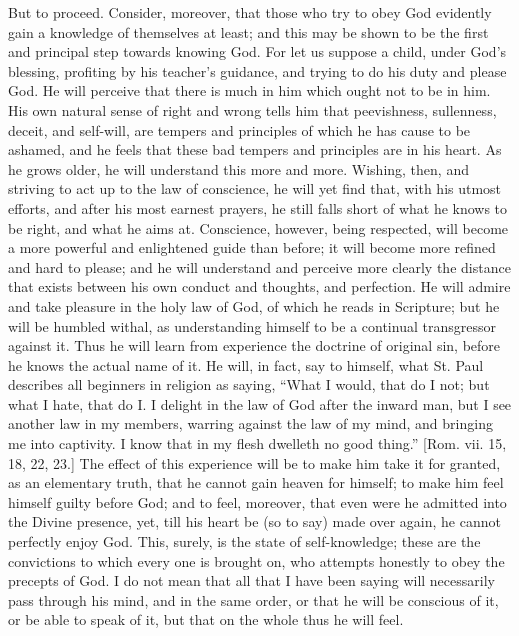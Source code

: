 But to proceed. Consider, moreover, that those who try to obey God
evidently gain a knowledge of themselves at least; and this may be
shown to be the first and principal step towards knowing God. For let
us suppose a child, under God's blessing, profiting by his teacher's
guidance, and trying to do his duty and please God. He will perceive
that there is much in him which ought not to be in him. His own
natural sense of right and wrong tells him that peevishness,
sullenness, deceit, and self-will, are tempers and principles of which
he has cause to be ashamed, and he feels that these bad tempers and
principles are in his heart. As he grows older, he will understand
this more and more. Wishing, then, and striving to act up to the law
of conscience, he will yet find that, with his utmost efforts, and
after his most earnest prayers, he still falls short of what he knows
to be right, and what he aims at. Conscience, however, being
respected, will become a more powerful and enlightened guide than
before; it will become more refined and hard to please; and he will
understand and perceive more clearly the distance that exists between
his own conduct and thoughts, and perfection. He will admire and take
pleasure in the holy law of God, of which he reads in Scripture; but
he will be humbled withal, as understanding himself to be a continual
transgressor against it. Thus he will learn from experience the
doctrine of original sin, before he knows the actual name of it. He
will, in fact, say to himself, what St. Paul describes all beginners
in religion as saying, ``What I would, that do I not; but what I
hate, that do I. I delight in the law of God after the inward man, but
I see another law in my members, warring against the law of my mind,
and bringing me into captivity. I know that in my flesh dwelleth no
good thing.'' [Rom. vii. 15, 18, 22, 23.] The effect of this
experience will be to make him take it for granted, as an elementary
truth, that he cannot gain heaven for himself; to make him feel
himself guilty before God; and to feel, moreover, that even were he
admitted into the Divine presence, yet, till his heart be (so to say)
made over again, he cannot perfectly enjoy God. This, surely, is the
state of self-knowledge; these are the convictions to which every one
is brought on, who attempts honestly to obey the precepts of God. I do
not mean that all that I have been saying will necessarily pass
through his mind, and in the same order, or that he will be conscious
of it, or be able to speak of it, but that on the whole thus he will
feel.

